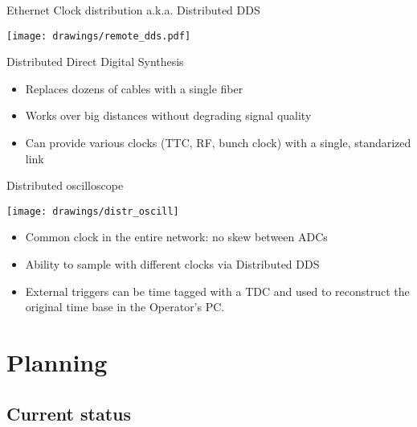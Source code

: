 \documentclass[xcolor=dvipsnames]{beamer}
\begin{document}
\begin{frame}{Ethernet Clock distribution a.k.a. Distributed DDS}
  \begin{center}
    \texttt{[image: drawings/remote\_dds.pdf]}
  \end{center}
  \begin{block}{Distributed Direct Digital Synthesis}
    \begin{itemize}
    \item Replaces dozens of cables with a single fiber
    \item Works over big distances without degrading signal quality
    \item Can provide various clocks (TTC, RF, bunch clock) with a single, standarized link
    \end{itemize}
  \end{block}
\end{frame}


\begin{frame}{Distributed oscilloscope}
  \begin{center}
    \texttt{[image: drawings/distr\_oscill]}
    \end{center}
    \begin{block}{}
      \begin{itemize}
      \item Common clock in the entire network: no skew between ADCs
      \item Ability to sample with different clocks via Distributed DDS
      \item External triggers can be time tagged with a TDC and used to reconstruct the original time base in the Operator's PC.
      \end{itemize}
    \end{block}
\end{frame}



\section{Planning}

\subsection{Current status}
\end{document}

